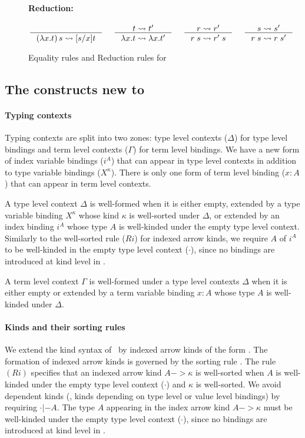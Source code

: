 \begin{figure}
\begin{framed}
\paragraph{Reduction:} 
\[ \inference{}{(\lambda x.t)\,s \rightsquigarrow [s/x]t}
 ~~~~
   \inference{t \rightsquigarrow t'}{\lambda x.t \rightsquigarrow \lambda x.t'}
 ~~~~
   \inference{r \rightsquigarrow r'}{r\;s \rightsquigarrow r'\;s}
 ~~~~
   \inference{s \rightsquigarrow s'}{r\;s \rightsquigarrow r\;s'}
\]
\end{framed}
\caption{Equality rules and Reduction rules for \Fi}
\label{fig:eqFi}
\end{figure}

\subsection{The constructs new to \Fi}

\paragraph{Typing contexts}
Typing contexts are split into two zones:
type level contexts ($\Delta$) for type level bindings
and term level contexts ($\Gamma$) for term level bindings.
We have a new form of index variable bindings ($i^A$) that can appear in
type level contexts in addition to type variable bindings ($X^\kappa$).
There is only one form of term level binding ($x:A$) that can appear in
term level contexts.

A type level context $\Delta$ is well-formed when it is either empty,
extended by a type variable binding $X^\kappa$ whose kind $\kappa$ is
well-sorted under $\Delta$, or extended by an index binding $i^A$
whose type $A$ is well-kinded under the empty type level context.
Similarly to the well-sorted rule ($Ri$) for indexed arrow kinds,
we require $A$ of $i^A$ to be well-kinded in the empty type level context
($\cdot$), since no bindings are introduced at kind level in \Fi.

A term level context $\Gamma$ is well-formed under a type level contexts
$\Delta$ when it is either empty or extended by a term variable binding
$x:A$ whose type $A$ is well-kinded under $\Delta$.


\paragraph{Kinds and their sorting rules}
We extend the kind syntax of \Fw\ by indexed arrow kinds of the form
. The formation of indexed arrow kinds is
governed by the sorting rule . The rule $(Ri)$ specifies that
an indexed arrow kind $A -> \kappa$ is well-sorted when $A$ is well-kinded
under the empty type level context ($\cdot$) and $\kappa$ is well-sorted.
We avoid dependent kinds (\ie, kinds depending on type level or value level
bindings) by requiring $\cdot |- A$. The type $A$ appearing in
the index arrow kind $A -> \kappa$ must be well-kinded under
the empty type level context ($\cdot$), since no bindings are
introduced at kind level in \Fi.

